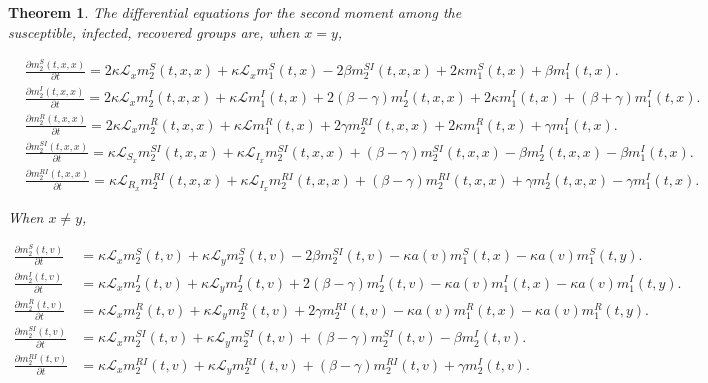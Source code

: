 \documentclass[sn-basic]{sn-jnl}%
\theoremstyle{thmstyleone}%
\newtheorem{theorem}{Theorem}%
\theoremstyle{thmstyletwo}%
\theoremstyle{thmstylethree}%
\numberwithin{equation}{theorem}
\begin{document}
\begin{theorem} \label{thm: diff eq for sec moment}
The differential equations for the second moment among the susceptible, infected, recovered groups are, when $x=y$,
\begin{small}
\begin{align*}
&\displaystyle \frac{\partial m_{2}^{S}(t,x,x)}{\partial t}= 2\kappa \mathcal{L}_{x}m_{2}^{S}(t,x,x) + \kappa \mathcal{L}_{x} m_{1}^{S}(t,x) - 2 \beta m_{2}^{SI}(t,x,x) + 2 \kappa m_{1}^{S}(t,x)+ \beta m_{1}^{I}(t,x).\\
&\displaystyle \frac{\partial m_{2}^{I}(t,x,x)}{\partial t} =  2 \kappa \mathcal{L}_{x} m_{2}^{I}(t,x,x) + \kappa \mathcal{L} m_{1}^{I}(t,x) + 2(\beta - \gamma) m_{2}^{I}(t,x,x) + 2 \kappa m_{1}^{I}(t,x)+ (\beta + \gamma) m_{1}^{I}(t,x).\\
&\displaystyle \frac{\partial m_{2}^{R}(t,x,x)}{\partial t} = 2 \kappa \mathcal{L}_{x} m_{2}^{R}(t,x,x) + \kappa \mathcal{L} m_{1}^{R}(t,x) + 2 \gamma m_{2}^{RI}(t,x,x) + 2 \kappa m_{1}^{R}(t,x)+ \gamma m_{1}^{I}(t,x).\\
&\displaystyle\frac{\partial m_{2}^{SI}(t,x,x)}{\partial t}=  \kappa \mathcal{L}_{S_{x}}m_{2}^{SI}(t,x,x) + \kappa  \mathcal{L}_{I_{x}}m_{2}^{SI}(t,x,x) + (\beta - \gamma)m_{2}^{SI}(t,x,x)- \beta m_{2}^{I}(t,x,x) - \beta m_{1}^{I}(t,x).\\
&\displaystyle\frac{\partial m_{2}^{RI}(t,x,x)}{\partial t} =  \kappa \mathcal{L}_{R_{x}}m_{2}^{RI}(t,x,x) + \kappa  \mathcal{L}_{I_{x}}m_{2}^{RI}(t,x,x) + (\beta - \gamma)m_{2}^{RI}(t,x,x)+ \gamma m_{2}^{I}(t,x,x) - \gamma m_{1}^{I}(t,x).
\end{align*}
\end{small}
When $x \neq y$,
\begin{small}
\begin{align*}
\displaystyle \frac{\partial m_{2}^{S}(t,v)}{\partial t} &= \kappa \mathcal{L}_{x} m_{2}^{S}(t,v) + \kappa \mathcal{L}_{y} m_{2}^{S}(t,v) - 2 \beta m_{2}^{SI}(t,v) - \kappa a(v) m_{1}^{S}(t,x)-\kappa a(v) m_{1}^{S}(t,y).\\
\displaystyle \frac{\partial m_{2}^{I}(t,v)}{\partial t} &= \kappa \mathcal{L}_{x} m_{2}^{I}(t,v) + \kappa \mathcal{L}_{y} m_{2}^{I}(t,v) + 2(\beta- \gamma) m_{2}^{I}(t,v) - \kappa a(v) m_{1}^{I}(t,x)- \kappa a(v) m_{1}^{I}(t,y).\\
\displaystyle \frac{\partial m_{2}^{R}(t,v)}{\partial t} &= \kappa \mathcal{L}_{x} m_{2}^{R}(t,v) + \kappa \mathcal{L}_{y} m_{2}^{R}(t,v) + 2 \gamma m_{2}^{RI}(t,v) -\kappa a(v)m_{1}^{R}(t,x)- \kappa a(v)m_{1}^{R}(t,y).\\
\displaystyle \frac{\partial m_{2}^{SI}(t,v)}{\partial t} &= \kappa \mathcal{L}_{x}m_{2}^{SI}(t,v) + \kappa \mathcal{L}_{y}m_{2}^{SI}(t,v) + (\beta-\gamma)m_{2}^{SI}(t,v) - \beta m_{2}^{I}(t,v). \\
\displaystyle \frac{\partial m_{2}^{RI}(t,v)}{\partial t} &= \kappa \mathcal{L}_{x}m_{2}^{RI}(t,v) + \kappa \mathcal{L}_{y}m_{2}^{RI}(t,v) + (\beta-\gamma)m_{2}^{RI}(t,v) + \gamma m_{2}^{I}(t,v).
\end{align*}
\end{small}
\end{theorem}
\end{document}
